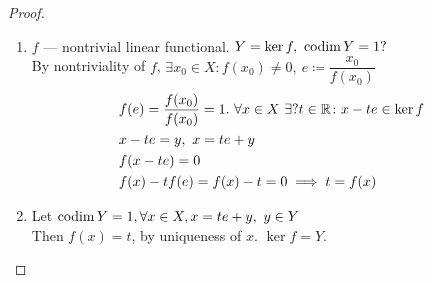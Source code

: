 \begin{proof}
  \begin{enumerate}
  \item $f$ --- nontrivial linear functional. $Y = \ker{f},\ \codim{Y} = 1?$ \\
    By nontriviality of $f$, $\exists x_0 \in X \colon f(x_0) \neq 0,\ e \coloneqq
    \dfrac{x_0}{f(x_0)}$ 
    \begin{align*}
      &f(e) = \dfrac{f(x_0)}{f(x_0)} = 1.\ \forall x \in X\ \exists ? t \in \mathbb{R}
      \colon x - t e \in \ker{f} \\
      &x - te = y,\ x = te + y \\
      &f(x - te) = 0  \\
      &f(x) - tf(e) = f(x) - t = 0 \implies t = f(x)
    \end{align*}

  \item Let $\operatorname{codim}{Y} = 1, \forall x \in X, x = te + y,\ y \in Y$ \\
    Then $f(x) = t$, by uniqueness of $x$. $\ker{f} = Y$.
  \end{enumerate}
\end{proof}
